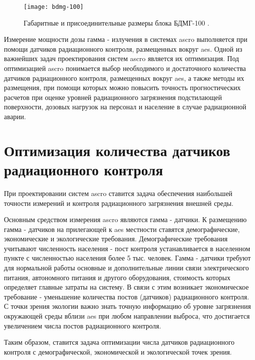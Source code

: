 \begin{figure}[ht!]
    \centering
    \texttt{[image: bdmg-100]}
    \captionsetup{justification=centering}
    \caption{Габаритные и присоединительные размеры блока БДМГ-100 \cite{bdmg-100}.}
    \label{fig_bdmg_100}
\end{figure}

Измерение мощности дозы гамма - излучения в системах \ac{ascro} выполняется при помощи датчиков радиационного контроля, 
размещенных вокруг \ac{aes}. Одной из важнейших задач проектирования систем \ac{ascro} является их оптимизация. Под 
оптимизацией \ac{ascro} понимается выбор необходимого и достаточного количества датчиков радиационного контроля, 
размещенных вокруг \ac{aes}, а также методы их размещения, при помощи которых можно повысить точность прогностических 
расчетов при оценке уровней радиационного загрязнения подстилающей поверхности, дозовых нагрузок на персонал и население 
в случае радиационной аварии.

\section{Оптимизация количества датчиков радиационного контроля}

При проектировании систем \ac{ascro} ставится задача обеспечения наибольшей точности измерений и контроля радиационного 
загрязнения внешней среды. 

Основным средством измерения \ac{ascro} являются гамма - датчики. К размещению гамма - датчиков на прилегающей к \ac{aes} 
местности ставятся демографические, экономические и экологические требования. Демографические требования учитывают 
численность населения - пост контроля устанавливается в населенном пункте с численностью населения более 5 тыс. человек. 
Гамма - датчики требуют для нормальной работы основные и дополнительные линии связи электрического питания, автономного 
питания и другого оборудования, стоимость которых определяет главные затраты на систему. В связи с этим возникает 
экономическое требование - уменьшение количества постов (датчиков) радиационного контроля. С точки зрения экологии 
важно знать точную информацию об уровне загрязнения окружающей среды вблизи \ac{aes} при любом направлении выброса, что 
достигается увеличением числа постов радиационного контроля.

Таким образом, ставится задача оптимизации числа датчиков радиационного контроля с демографической, экономической и 
экологической точек зрения.

